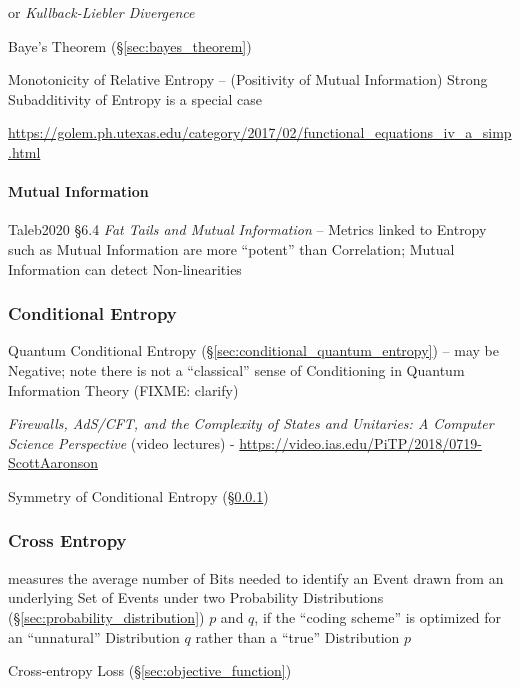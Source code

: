 or \emph{Kullback-Liebler Divergence}

\fist Baye's Theorem (\S\ref{sec:bayes_theorem})

Monotonicity of Relative Entropy -- (Positivity of Mutual Information) Strong
Subadditivity of Entropy is a special case

\url{https://golem.ph.utexas.edu/category/2017/02/functional_equations_iv_a_simp.html}



\paragraph{Mutual Information}\label{sec:mutual_information}\hfill

Taleb2020 \S 6.4 \emph{Fat Tails and Mutual Information} -- Metrics linked to
Entropy such as Mutual Information are more ``potent'' than Correlation; Mutual
Information can detect Non-linearities



\subsubsection{Conditional Entropy}\label{sec:conditional_entropy}

\fist Quantum Conditional Entropy (\S\ref{sec:conditional_quantum_entropy}) --
may be Negative; note there is not a ``classical'' sense of Conditioning in
Quantum Information Theory (FIXME: clarify)

\asterism

\emph{Firewalls, AdS/CFT, and the Complexity of States and Unitaries: A Computer
  Science Perspective}
(video lectures)
-
\url{https://video.ias.edu/PiTP/2018/0719-ScottAaronson}

Symmetry of Conditional Entropy (\S\ref{sec:conditional_entropy})



\subsubsection{Cross Entropy}\label{sec:cross_entropy}

measures the average number of Bits needed to identify an Event drawn from an
underlying Set of Events under two Probability Distributions
(\S\ref{sec:probability_distribution}) $p$ and $q$, if the ``coding scheme'' is
optimized for an ``unnatural'' Distribution $q$ rather than a ``true''
Distribution $p$

Cross-entropy Loss (\S\ref{sec:objective_function})

